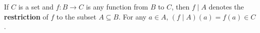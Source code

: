 If $C$ is a set and $f : B \to C$ is any function from $B$ to $C$, then $f \mid A$ denotes the \textbf{restriction} of $f$ to the subset $A \subseteq B$. For any $a \in A$, $(f \mid A)(a) = f(a) \in C$.
